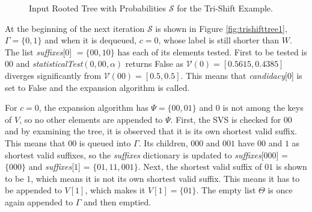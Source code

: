 {\begin{figure}[H]
\caption{Input Rooted Tree with Probabilities $\mathcal{S}$ for the Tri-Shift Example. \label{fig:trishifttree0}}
\end{figure}

At the beginning of the next iteration $\mathcal{S}$ is shown in Figure \ref{fig:trishifttree1}, $\Gamma = \{0, 1\}$ and when it is dequeued, $c = 0$, whose label is still shorter than $W$. The list \textit{suffixes}[$0$] $= \{00, 10\}$ has each of its elements tested. First to be tested is $00$ and \textit{statisticalTest}$(0,00,\alpha)$ returns False as $\mathcal{V}(0) = [0.5615, 0.4385]$ diverges significantly from $\mathcal{V}(00) = [0.5, 0.5]$. This means that \textit{candidacy}[$0$] is set to False and the expansion algorithm is called.

For $c = 0$, the expansion algorithm has $\Psi = \{00, 01\}$ and $0$ is not among the keys of $V$, so no other elements are appended to $\Psi$. First, the SVS is checked for $00$ and by examining the tree, it is observed that it is its own shortest valid suffix. This means that $00$ is queued into $\Gamma$. Its children, $000$ and $001$ have $00$ and $1$ as shortest valid suffixes, so the \textit{suffixes} dictionary is updated to \textit{suffixes}[$000$] = $\{000\}$ and \textit{suffixes}[$1$] = $\{01, 11, 001\}$. Next, the shortest valid suffix of $01$ is shown to be $1$, which means it is not its own shortest valid suffix. This means it has to be appended to $V[1]$, which makes it $V[1] = \{01\}$. The empty list $\Theta$ is once again appended to $\Gamma$ and then emptied. 

}
